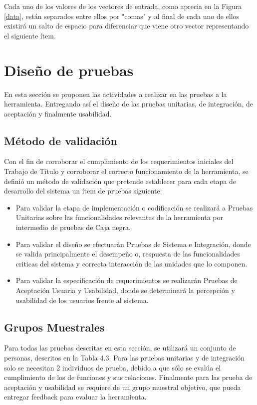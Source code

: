 Cada uno de los valores de los vectores de entrada, como aprecia en la Figura \ref{data}, están separados entre ellos por "comas" y al final de cada uno de ellos existirá un salto de espacio para diferenciar que viene otro vector representando el siguiente ítem. \\

\clearpage
\newpage


 \section{Diseño de pruebas}
 En esta sección se proponen las actividades a realizar en las pruebas a la herramienta. Entregando así el diseño de las pruebas unitarias, de integración, de aceptación y finalmente usabilidad.\\ 
\subsection{Método de validación}

 Con el fin de corroborar el cumplimiento de los requerimientos iniciales del Trabajo de Título y corroborar el correcto funcionamiento de la herramienta, se definió un método de validación que pretende establecer para cada etapa de desarrollo del sistema un ítem de pruebas siguiente:\\ 
 \begin{itemize}
 \item Para validar la etapa de implementación o codificación se realizará a Pruebas Unitarias sobre las funcionalidades relevantes de la herramienta por intermedio de pruebas de Caja negra.
 \item Para validar el diseño se efectuarán Pruebas de Sistema e Integración, donde se valida principalmente el desempeño o, respuesta de las funcionalidades criticas del sistema y correcta interacción de las unidades que lo componen.
 \item Para validar la especificación de requerimientos se realizarán Pruebas de Aceptación Usuaria y Usabilidad, donde se determinará la percepción y usabilidad de los usuarios frente al sistema.
\end{itemize}

\clearpage

\subsection{Grupos Muestrales}
Para todas las pruebas descritas en esta sección, se utilizará un conjunto de personas, descritos en la Tabla 4.3. Para las pruebas unitarias y de integración solo se necesitan 2 individuos de prueba, debido a que sólo se evalúa el cumplimiento de los de funciones y sus relaciones. Finalmente para las prueba de aceptación y usabilidad se requiere de un grupo muestral objetivo, que pueda entregar feedback para evaluar la herramienta.\\

